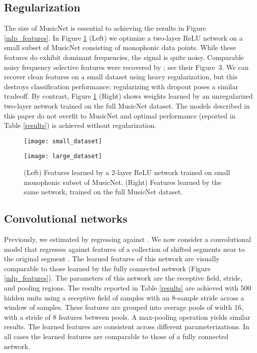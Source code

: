 \documentclass{article} \usepackage{iclr2017_conference,times}
\begin{document}
\subsection{Regularization}\label{reg_section}

The size of MusicNet is essential to achieving the results in Figure \ref{mlp_features}. In Figure \ref{regularization} (Left) we optimize a two-layer ReLU network on a small subset of MusicNet consisting of  monophonic data points. While these features do exhibit dominant frequencies, the signal is quite noisy. Comparable noisy frequency selective features were recovered by \cite{dieleman}; see their Figure~3. We can recover clean features on a small dataset using heavy regularization, but this destroys classification performance; regularizing with dropout poses a similar tradeoff. By contrast, Figure \ref{regularization} (Right) shows weights learned by an unregularized two-layer network trained on the full MusicNet dataset. The models described in this paper do not overfit to MusicNet and optimal performance (reported in Table \ref{results}) is achieved without regularization.



\begin{figure}[h]
  \centering
  
  \begin{minipage}{.5\textwidth}
  \centering
  \texttt{[image: small\_dataset]}
\end{minipage}\begin{minipage}{.5\textwidth}
\centering
  \texttt{[image: large\_dataset]}
\end{minipage}

  \caption{(Left) Features learned by a 2-layer ReLU network trained on small monophonic subset of MusicNet. (Right) Features learned by the same network, trained on the full MusicNet dataset.}
    \label{regularization}
\end{figure}

\subsection{Convolutional networks}

Previously, we estimated  by regressing against . We now consider a convolutional model that regresses against features of a collection of shifted segments  near to the original segment . The learned features of this network are visually comparable to those learned by the fully connected network (Figure \ref{mlp_features}). The parameters of this network are the receptive field, stride, and pooling regions. The results reported in Table \ref{results} are achieved with 500 hidden units using a receptive field of  samples with an 8-sample stride across a window of  samples. These features are grouped into average pools of width 16, with a stride of 8 features between pools. A max-pooling operation yields similar results. The learned features are consistent across different parameterizations. In all cases the learned features are comparable to those of a fully connected network.
\end{document}

